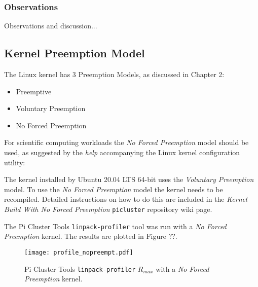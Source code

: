 \subsubsection{Observations}

Observations and discussion...



%
%
\subsection{Kernel Preemption Model}

The Linux kernel has 3 Preemption Models, as discussed in Chapter 2:

\begin{itemize}
\item Preemptive
\item Voluntary Preemption
\item No Forced Preemption
\end{itemize}

For scientific computing workloads the \emph{No Forced Preemption} model should be used, as suggested by the \emph{help} accompanying the Linux kernel configuration utility:


The kernel installed by Ubuntu 20.04 LTS 64-bit uses the \emph{Voluntary Preemption} model. To use the \emph{No Forced Preemption} model the kernel needs to be recompiled. Detailed instructions on how to do this are included in the \emph{Kernel Build With No Forced Preemption} \verb|picluster| repository wiki page.

The Pi Cluster Tools \verb|linpack-profiler| tool was run with a \emph{No Forced Preemption} kernel. The results are plotted in Figure ??.

\begin{figure}[h]
	\centering
	\texttt{[image: profile\_nopreempt.pdf]}
	\caption{Pi Cluster Tools \texttt{linpack-profiler} $R_{max}$ with a \emph{No Forced Preemption} kernel.}
	\label{fig:subim1}
\end{figure}

